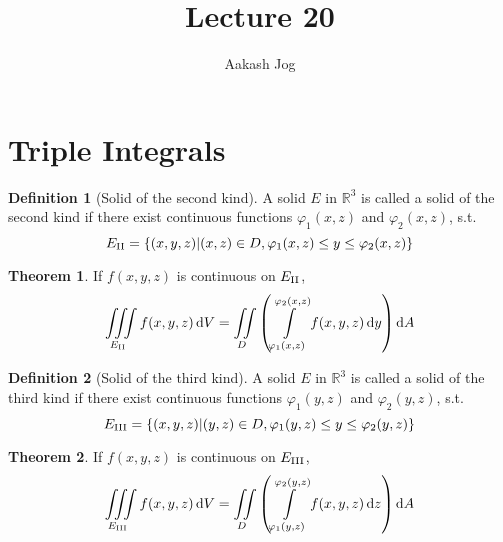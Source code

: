 \documentclass[fleqn, a4paper, 12pt]{article}
\title{Lecture 20}
\author{Aakash Jog}
\date{\formatdate{6}{1}{2015}}
\theoremstyle{definition}
\newtheorem{definition}{Definition}
\theoremstyle{theorem}
\newtheorem{theorem}{Theorem}
\theoremstyle{remark}
\begin{document}
	
\maketitle

\tableofcontents

\newpage

\section{Triple Integrals}

\begin{definition}[Solid of the second kind]
	A solid $E$ in $\mathbb{R}^3$ is called a solid of the second kind if there exist continuous functions $\varphi_1(x,z)$ and $\varphi_2(x,z)$, s.t.
	\begin{equation*}
		E_{\textnormal{II}} = \{(x,y,z) | (x,z) \in D, \varphi_1(x,z) \leq y \leq \varphi_2(x,z)\}
	\end{equation*}
\end{definition}

\begin{theorem}
	If $f(x,y,z)$ is continuous on $E_{\textnormal{II}}$,
	\begin{equation*}
		\iiint\limits_{E_{\textnormal{II}}} f(x,y,z) \dif V = \iint\limits_{D} \left( \int\limits_{\varphi_1(x,z)}^{\varphi_2(x,z)} f(x,y,z) \dif y \right) \dif A
	\end{equation*}
\end{theorem}

\begin{definition}[Solid of the third kind]
	A solid $E$ in $\mathbb{R}^3$ is called a solid of the third kind if there exist continuous functions $\varphi_1(y,z)$ and $\varphi_2(y,z)$, s.t.
	\begin{equation*}
	E_{\textnormal{III}} = \{(x,y,z) | (y,z) \in D, \varphi_1(y,z) \leq y \leq \varphi_2(y,z)\}
	\end{equation*}
\end{definition}

\begin{theorem}
	If $f(x,y,z)$ is continuous on $E_{\textnormal{III}}$,
	\begin{equation*}
	\iiint\limits_{E_{\textnormal{III}}} f(x,y,z) \dif V = \iint\limits_{D} \left( \int\limits_{\varphi_1(y,z)}^{\varphi_2(y,z)} f(x,y,z) \dif z \right) \dif A
	\end{equation*}
\end{theorem}
\end{document}
